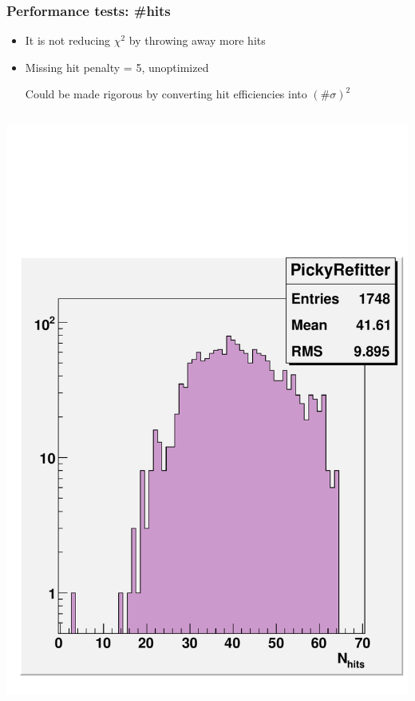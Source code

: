 \documentclass[compress]{beamer}
\begin{document}
\begin{frame}
\frametitle{Performance tests: \#hits}

\begin{itemize}
\item It is not reducing $\chi^2$ by throwing away more hits
\item Missing hit penalty = 5, unoptimized

Could be made rigorous by converting hit efficiencies into $(\#\sigma)^2$
\end{itemize}

\vfill
\begin{columns}
\includegraphics[width=\linewidth]{nhits_picky.pdf}

\end{columns}
\end{frame}
\end{document}
